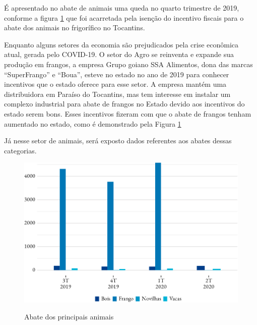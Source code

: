 \par É apresentado no abate de animais uma queda no quarto trimestre de 2019, conforme a figura \ref{fig:abate} que foi acarretada pela isenção do incentivo fiscais para o abate dos animais no frigorífico no Tocantins.

\par Enquanto alguns setores da economia são prejudicados pela crise econômica atual, gerada pelo COVID-19. O setor do Agro se reinventa e expande sua produção em frangos, a empresa Grupo goiano SSA Alimentos, dona das marcas “SuperFrango” e “Boua”, esteve no estado no ano de 2019 para conhecer incentivos que o estado oferece para esse setor. A empresa mantém uma distribuidora em Paraíso do Tocantins, mas tem interesse em instalar um complexo industrial para abate de frangos no Estado devido aos incentivos do estado serem bons. Esses incentivos fizeram com que o abate de frangos tenham aumentado no estado, como é demonstrado pela Figura \ref{fig:abate}


\par Já nesse setor de animais, será exposto dados referentes aos abates dessas categorias.

\begin{figure}[!h]
	\caption{Abate dos principais animais}
	\includegraphics{fig/abates-1.pdf}
	\label{fig:abate}
	\notes{\trimestres}
\end{figure}
